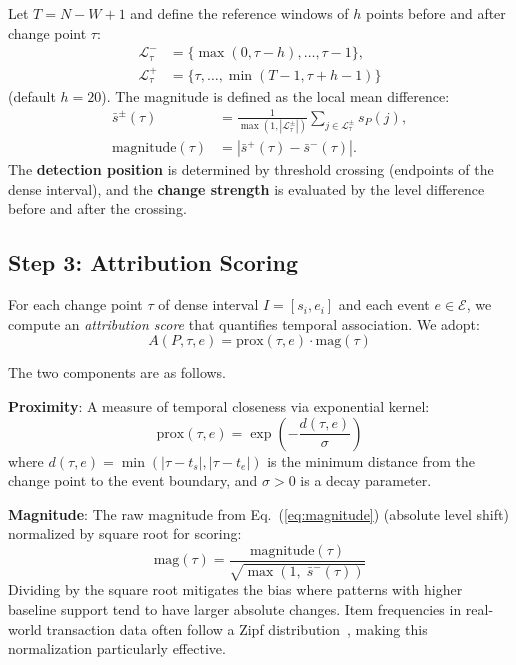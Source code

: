 Let $T = N-W+1$ and define the reference windows of $h$ points before and after change point $\tau$:
\begin{align*}
\mathcal{L}^{-}_{\tau} &= \{\max(0, \tau-h), \ldots, \tau-1\},\\
\mathcal{L}^{+}_{\tau} &= \{\tau, \ldots, \min(T-1, \tau+h-1)\}
\end{align*}
(default $h = 20$). The magnitude is defined as the local mean difference:
\begin{align}
\bar{s}^{\pm}(\tau) &= \frac{1}{\max(1,|\mathcal{L}^{\pm}_{\tau}|)}\sum_{j \in \mathcal{L}^{\pm}_{\tau}} s_P(j), \nonumber\\
\text{magnitude}(\tau) &= |\bar{s}^{+}(\tau) - \bar{s}^{-}(\tau)|.
\label{eq:magnitude}
\end{align}
The \textbf{detection position} is determined by threshold crossing (endpoints of the dense interval),
and the \textbf{change strength} is evaluated by the level difference before and after the crossing.

\subsection{Step 3: Attribution Scoring}

For each change point $\tau$ of dense interval $I = [s_i, e_i]$
and each event $e \in \mathcal{E}$,
we compute an \emph{attribution score} that quantifies temporal association.
We adopt:
\begin{equation}
A(P, \tau, e) = \text{prox}(\tau, e) \cdot \text{mag}(\tau)
\label{eq:attribution_score}
\end{equation}

The two components are as follows.

\textbf{Proximity}: A measure of temporal closeness via exponential kernel:
\begin{equation}
\text{prox}(\tau, e) = \exp\left(-\frac{d(\tau, e)}{\sigma}\right)
\label{eq:proximity}
\end{equation}
where $d(\tau, e) = \min(|\tau - t_s|, |\tau - t_e|)$ is the minimum distance
from the change point to the event boundary, and $\sigma > 0$ is a decay parameter.

\textbf{Magnitude}: The raw magnitude from Eq.~(\ref{eq:magnitude}) (absolute level shift)
normalized by square root for scoring:
\begin{equation}
\text{mag}(\tau) = \frac{\text{magnitude}(\tau)}{\sqrt{\max(1,\; \bar{s}^{-}(\tau))}}
\label{eq:mag_sqrt}
\end{equation}
Dividing by the square root mitigates the bias where patterns with higher baseline support
tend to have larger absolute changes.
Item frequencies in real-world transaction data often follow a Zipf distribution~\cite{fournier2017survey},
making this normalization particularly effective.

